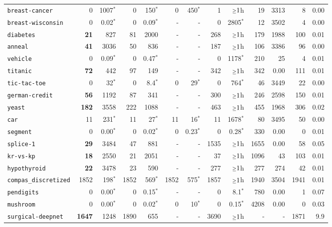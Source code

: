 \begin{tabular}{lrrrrrrrrrrrr}
\texttt{breast-cancer} & 0 & 1007$^*$ & 0 & 150$^*$ & 0 & 450$^*$ & 1 & $\mathsmaller{\geq}1$h & 19 & 3313 & 8 & 0.00\\
\texttt{breast-wisconsin} & 0 & 0.02$^*$ & 0 & 0.09$^*$ & - & - & 0 & 2805$^*$ & 12 & 3502 & 4 & 0.00\\
\texttt{diabetes} & \textbf{21} & 827 & 81 & 2000 & - & - & 268 & $\mathsmaller{\geq}1$h & 179 & 1988 & 100 & 0.01\\
\texttt{anneal} & \textbf{41} & 3036 & 50 & 836 & - & - & 187 & $\mathsmaller{\geq}1$h & 106 & 3386 & 96 & 0.00\\
\texttt{vehicle} & 0 & 0.09$^*$ & 0 & 0.47$^*$ & - & - & 0 & 1178$^*$ & 210 & 25 & 4 & 0.01\\
\texttt{titanic} & \textbf{72} & 442 & 97 & 149 & - & - & 342 & $\mathsmaller{\geq}1$h & 342 & 0.00 & 111 & 0.01\\
\texttt{tic-tac-toe} & 0 & 32$^*$ & 0 & 8.4$^*$ & 0 & 29$^*$ & 0 & 764$^*$ & 46 & 3449 & 22 & 0.00\\
\texttt{german-credit} & \textbf{56} & 1192 & 87 & 341 & - & - & 300 & $\mathsmaller{\geq}1$h & 246 & 2598 & 150 & 0.01\\
\texttt{yeast} & \textbf{182} & 3558 & 222 & 1088 & - & - & 463 & $\mathsmaller{\geq}1$h & 455 & 1968 & 306 & 0.02\\
\texttt{car} & 11 & 231$^*$ & 11 & 27$^*$ & 11 & 16$^*$ & 11 & 1678$^*$ & 80 & 3495 & 50 & 0.00\\
\texttt{segment} & 0 & 0.00$^*$ & 0 & 0.02$^*$ & 0 & 0.23$^*$ & 0 & 0.28$^*$ & 330 & 0.00 & 0 & 0.01\\
\texttt{splice-1} & \textbf{29} & 3484 & 47 & 881 & - & - & 1535 & $\mathsmaller{\geq}1$h & 1655 & 0.00 & 58 & 0.05\\
\texttt{kr-vs-kp} & \textbf{18} & 2550 & 21 & 2051 & - & - & 37 & $\mathsmaller{\geq}1$h & 1096 & 43 & 103 & 0.01\\
\texttt{hypothyroid} & \textbf{22} & 3478 & 23 & 590 & - & - & 277 & $\mathsmaller{\geq}1$h & 277 & 274 & 42 & 0.01\\
\texttt{compas\_discretized} & 1852 & 198$^*$ & 1852 & 569$^*$ & 1852 & 575$^*$ & 1857 & $\mathsmaller{\geq}1$h & 1940 & 3504 & 1941 & 0.01\\
\texttt{pendigits} & 0 & 0.00$^*$ & 0 & 0.15$^*$ & - & - & 0 & 8.1$^*$ & 780 & 0.00 & 1 & 0.07\\
\texttt{mushroom} & 0 & 0.00$^*$ & 0 & 0.02$^*$ & 0 & 10$^*$ & 0 & 0.15$^*$ & 4208 & 0.00 & 0 & 0.03\\
\texttt{surgical-deepnet} & \textbf{1647} & 1248 & 1890 & 655 & - & - & 3690 & $\mathsmaller{\geq}1$h & - & - & 1871 & 9.9\\

\end{tabular}
